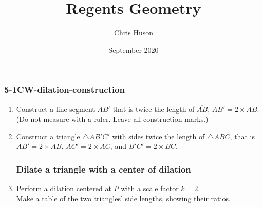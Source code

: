 \documentclass[12pt, twoside]{article}
\title{Regents Geometry}
\author{Chris Huson}
\date{September 2020}
\begin{document}
\subsubsection*{5-1CW-dilation-construction}
\begin{enumerate}
\item Construct a line segment $\overline{AB'}$ that is twice the length of $\overline{AB}$, $AB' = 2 \times AB$. \\ (Do not measure with a ruler. Leave all construction marks.)
    \vspace{1cm}
    \begin{center}
    \end{center}
    \vspace{3cm}

\item Construct a triangle $\triangle AB'C'$ with sides twice the length of $\triangle ABC$, that is $AB' = 2 \times AB$, $AC' = 2 \times AC$, and $B'C' = 2 \times BC$.
    \vspace{5cm}
    \begin{flushleft}
  \end{flushleft} 

\newpage
\subsubsection*{Dilate a triangle with a center of dilation}
\item Perform a dilation centered at $P$ with a scale factor $k=2$. \\
  Make a table of the two triangles' side lengths, showing their ratios.
      \vspace{5cm}
      \begin{center}
      \end{center}


\end{enumerate}
\end{document}
